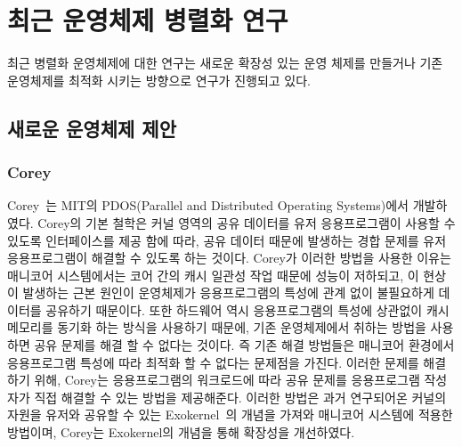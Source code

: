 
\newpage
\section{최근 운영체제 병렬화 연구}
\label{sec:osrelated}


최근 병렬화 운영체제에 대한 연구는 새로운 확장성 있는 운영 체제를 만들거나 
기존 운영체제를 최적화 시키는 방향으로 연구가 진행되고 있다.


\subsection{새로운 운영체제 제안}

\subsubsection{Corey}
Corey~\cite{Boyd-WickizerCorey}는 MIT의 PDOS(Parallel and Distributed Operating
Systems)에서 개발하였다.
Corey의 기본 철학은 커널 영역의 공유 데이터를 유저 응용프로그램이 사용할 수 있도록 인터페이스를 제공 함에 따라,
공유 데이터 때문에 발생하는 경합 문제를 유저 응용프로그램이 해결할 수 있도록 하는 것이다.
Corey가 이러한 방법을 사용한 이유는 매니코어 시스템에서는 코어 간의 캐시 일관성 작업 
때문에 성능이 저하되고, 이 현상이 발생하는 근본 원인이 운영체제가 응용프로그램의 특성에 관계 없이 
불필요하게 데이터를 공유하기 때문이다.
또한 하드웨어 역시 응용프로그램의 특성에 상관없이 캐시 메모리를 동기화 하는 방식을 사용하기 때문에,
기존 운영체제에서 취하는 방법을 사용하면 공유 문제를 해결 할 수 없다는 것이다.  
즉 기존 해결 방법들은 매니코어 환경에서 응용프로그램 특성에 따라 최적화 할 수 없다는 문제점을 가진다. 
이러한 문제를 해결하기 위해, Corey는 응용프로그램의 워크로드에 따라 공유 문제를 응용프로그램 작성자가 
직접 해결할 수 있는 방법을 제공해준다.
이러한 방법은 과거 연구되어온 커널의 자원을 유저와 공유할 수 있는 Exokernel~\cite{Engler1995EOS}의 개념을 가져와 
매니코어 시스템에 적용한 방법이며, Corey는 Exokernel의 개념을 통해 확장성을 개선하였다.


